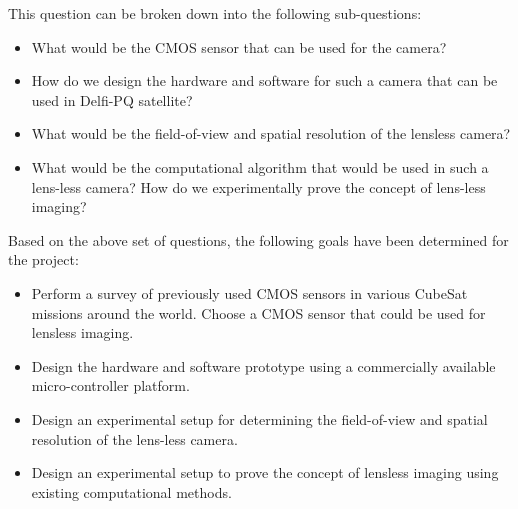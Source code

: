 This question can be broken down into the following sub-questions:
\begin{itemize}
\item What would be the CMOS sensor that can be used for the camera? 
\item How do we design the hardware and software for such a camera that can be used in Delfi-PQ satellite?
\item What would be the field-of-view and spatial resolution of the lensless camera?
\item What would be the computational algorithm that would be used in such a lens-less camera? How do we experimentally prove the concept of lens-less imaging?

\end{itemize}

Based on the above set of questions, the following goals have been determined for the project:
\begin{itemize}
\item Perform a survey of previously used CMOS sensors in various CubeSat missions around the world. Choose a CMOS sensor that could be used for lensless imaging.
\item Design the hardware and software prototype using a commercially available micro-controller platform.
\item Design an experimental setup for determining the field-of-view and spatial resolution of the lens-less camera.
\item Design an experimental setup to prove the concept of lensless imaging using existing computational methods. 
\end{itemize}
